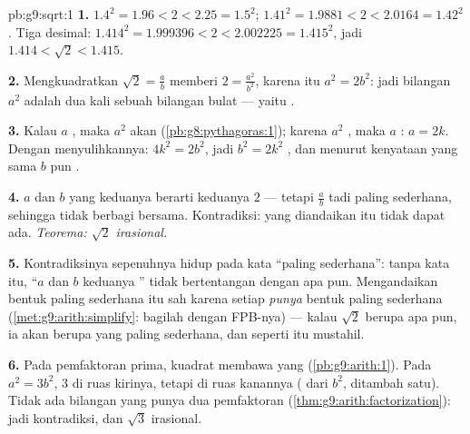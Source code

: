 \begin{solution}{pb:g9:sqrt:1}
\textbf{1.} $1.4^2 = 1.96 < 2 < 2.25 = 1.5^2$;
$1.41^2 = 1.9881 < 2 < 2.0164 = 1.42^2$. Tiga desimal:
$1.414^2 = 1.999396 < 2 < 2.002225 = 1.415^2$, jadi
$1.414 < \sqrt2 < 1.415$.

\textbf{2.} Mengkuadratkan $\sqrt2 = \frac ab$ memberi
$2 = \frac{a^2}{b^2}$, karena itu $a^2 = 2b^2$: jadi bilangan $a^2$
adalah dua kali sebuah bilangan bulat --- yaitu \emph{}.

\textbf{3.} Kalau $a$ , maka $a^2$ akan 
(\cref{pb:g8:pythagoras:1}); karena $a^2$ , maka $a$ :
$a = 2k$. Dengan menyulihkannya: $4k^2 = 2b^2$, jadi $b^2 = 2k^2$
, dan menurut kenyataan  yang sama $b$ pun .

\textbf{4.} $a$ dan $b$ yang keduanya  berarti keduanya  $2$ --- tetapi $\frac ab$ tadi paling sederhana, sehingga tidak
berbagi  bersama. Kontradiksi:  yang diandaikan itu
tidak dapat ada. \emph{Teorema: $\sqrt2$ irasional.}

\textbf{5.} Kontradiksinya sepenuhnya hidup pada kata ``paling
sederhana'': tanpa kata itu, ``$a$ dan $b$ keduanya '' tidak
bertentangan dengan apa pun. Mengandaikan bentuk paling sederhana itu
sah karena setiap  \emph{punya} bentuk paling sederhana
(\cref{met:g9:arith:simplify}: bagilah dengan FPB-nya) --- kalau
$\sqrt2$ berupa  apa pun, ia akan berupa  yang paling
sederhana, dan  seperti itu mustahil.

\textbf{6.} Pada pemfaktoran prima, kuadrat membawa  yang
 (\cref{pb:g9:arith:1}). Pada $a^2 = 3b^2$, 
$3$  di ruas kirinya, tetapi  di ruas kanannya ( dari
$b^2$, ditambah satu). Tidak ada bilangan yang punya dua pemfaktoran
(\cref{thm:g9:arith:factorization}): jadi kontradiksi, dan
$\sqrt3$ irasional.


\end{solution}
